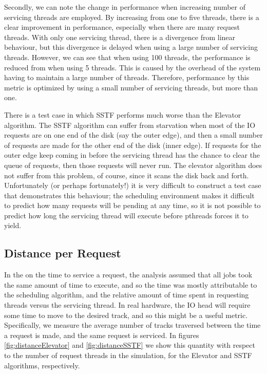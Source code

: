 \documentclass{report}
\begin{document}
Secondly, we can note
the change in performance when increasing number of servicing threads are employed. By
increasing from one to five threads, there is a clear improvement in  performance,
especially when there are many request threads. With only one servicing thread,
there is a divergence from linear behaviour, but this divergence is delayed when using a
large number of servicing threads. However, we can see that when using 100 threads, the
performance is reduced from when using 5 threads. This is caused by the overhead of
the system having to maintain a large number of threads. Therefore, performance by this
metric is optimized by using a small number of servicing threads, but more than one.

%
There is a test case in which SSTF performs much worse than the Elevator algorithm. The
SSTF algorithm can suffer from starvation when most of the IO requests are on one end of
the disk (say the outer edge), and then a small number of requests are made for the other
end of the disk (inner edge). If
requests for the outer edge keep coming in before the servicing thread has the chance to
clear the queue of requests, then those requests will never run. The elevator algorithm
does not suffer from this problem, of course, since it scans the disk back and forth.
Unfortunately (or perhaps fortunately!) it is very difficult to construct a test case that demonstrates this
behaviour; the scheduling environment makes it difficult to predict how many
requests will be pending at any time, so it is not possible to predict how long the servicing
thread will execute before pthreads forces it to yield.

\subsection{Distance per Request}
In the on the time to service a request, the analysis assumed that all jobs took the same
amount of time to execute, and so the time was mostly attributable to the scheduling
algorithm, and the relative amount of time spent in requesting threads versus the
servicing thread. In real hardware, the IO head will require some time to move to the
desired track, and so this might be a useful metric. Specifically, we measure the average
number of tracks traversed between the time a request is made, and the same request is
serviced. In figures \ref{fig:distanceElevator} and \ref{fig:distanceSSTF} we show this 
quantity with respect to the number of request threads in the simulation, for the
Elevator and SSTF algorithms, respectively.
\end{document}
